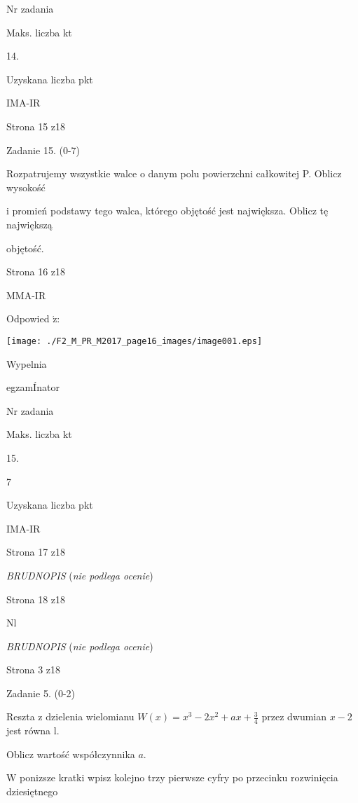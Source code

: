 \documentclass[a4paper,12pt]{article}
\begin{document}
Nr zadania

Maks. liczba kt

14.

Uzyskana liczba pkt

IMA-IR

Strona 15 z18





Zadanie 15. (0-7)

Rozpatrujemy wszystkie walce o danym polu powierzchni całkowitej P. Oblicz wysokość

i promień podstawy tego walca, którego objętość jest największa. Oblicz tę największą

objętość.

Strona 16 z18

MMA-IR





Odpowied $\acute{\mathrm{z}}$:
\begin{center}
\texttt{[image: ./F2\_M\_PR\_M2017\_page16\_images/image001.eps]}
\end{center}
Wypelnia

egzamÍnator

Nr zadania

Maks. liczba kt

15.

7

Uzyskana liczba pkt

IMA-IR

Strona 17 z18





{\it BRUDNOPIS} ({\it nie podlega ocenie})

Strona 18 z18

Nl





{\it BRUDNOPIS} ({\it nie podlega ocenie})

Strona 3 z18





Zadanie 5. (0-2)

Reszta z dzielenia wielomianu $W(x)=x^{3}-2x^{2}+ax+\displaystyle \frac{3}{4}$ przez dwumian $x-2$ jest równa l.

Oblicz wartość współczynnika $a.$

$\mathrm{W}$ ponizsze kratki wpisz kolejno trzy pierwsze cyfry po przecinku rozwinięcia dziesiętnego
\end{document}
